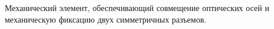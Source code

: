Механический элемент, обеспечивающий совмещение
оптических осей и механическую фиксацию двух
симметричных разъемов.